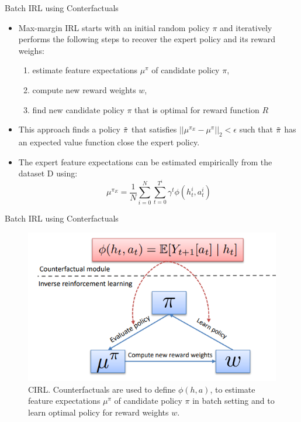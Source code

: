 \documentclass{beamer}
\begin{document}
\begin{frame}{Batch IRL using Conterfactuals}
    \begin{itemize}
        \item Max-margin IRL starts with an initial random policy $\pi$ and iteratively performs the following steps to recover the expert policy and its reward weighs: 
        \begin{enumerate}
            \item estimate feature expectations $\mu^\pi$ of candidate policy $\pi$,
            \item compute new reward weights $w$,
            \item  find new candidate policy $\pi$ that is optimal for reward function $R$
        \end{enumerate}

        \item This approach finds a policy $\Tilde{\pi}$ that satisfies $||\mu^{\pi_E}- \mu^\pi||_2 < \epsilon$ such that $\Tilde{\pi}$ has an expected value function close the expert policy.

        \item The expert feature expectations can be estimated empirically from the dataset D using:
            \begin{equation*}
                \mu^{\pi_E} = \frac{1}{N} \sum_{i=0}^N \sum_{t=0}^{T^i} \gamma^t \phi(h_t^i, a_t^i)
            \end{equation*}

    \end{itemize}
\end{frame}

\begin{frame}{Batch IRL using Conterfactuals}
    
    \begin{figure}
        \centering
        \includegraphics[width=0.7\linewidth]{fig2.png}
        \caption{CIRL. Counterfactuals are used to define $\phi(h, a)$, to estimate feature expectations $\mu^\pi$ of candidate policy $\pi$ in batch setting and to learn optimal policy for reward weights $w$.}
        \label{fig2}
    \end{figure}
\end{frame}
\end{document}
